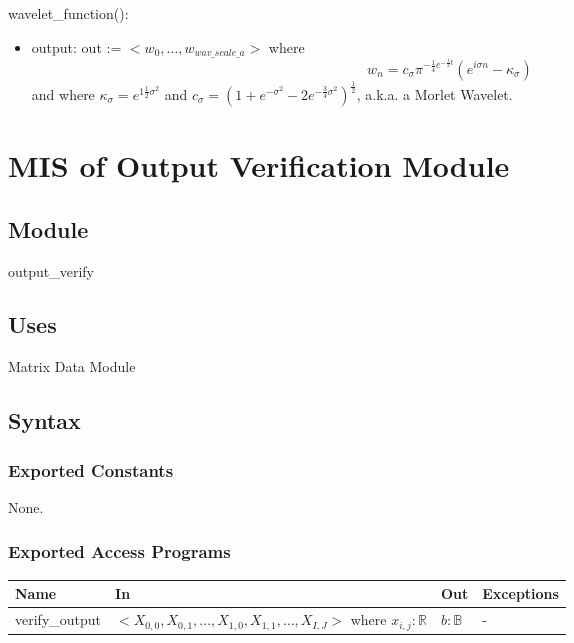 \documentclass[12pt, titlepage]{article}
\begin{document}
\noindent wavelet\_function():
\begin{itemize}
\item output: out := $< w_0, \dots, w_{wav\_scale\_a}>$ where 
\begin{equation}
w_n = c_\sigma \pi^{-\frac{1}{4} e^{- \frac{1}{2} t}} (e^{i \sigma n} - \kappa_\sigma)
\end{equation}
and where $ \kappa_\sigma = e^{1 \frac{1}{2} \sigma^2}$  and  $c_\sigma = (1 + e^{- \sigma^2} - 2 e^{- \frac{3}{4} \sigma^2})^{\frac{1}{2}}$, a.k.a. a Morlet Wavelet.
\end{itemize}

 
  \newpage
\section{MIS of Output Verification Module} \label{Module} 



\subsection{Module}
output\_verify

\subsection{Uses}
Matrix Data Module 
\subsection{Syntax}

\subsubsection{Exported Constants}
None.
\subsubsection{Exported Access Programs}

\begin{center}
\begin{tabular}{p{2cm} p{4cm} p{4cm} p{2cm}}
\hline
\textbf{Name} & \textbf{In} & \textbf{Out} & \textbf{Exceptions} \\
\hline
verify\_output & $<X_{0,0},X_{0,1},\dots, X_{1,0},X_{1,1},\dots, X_{I,J}>$ where $ x_{i,j}:\mathbb{R}$ & $b: \mathbb{B}$ &  -\\
\hline
\end{tabular}
\end{center}
\end{document}
